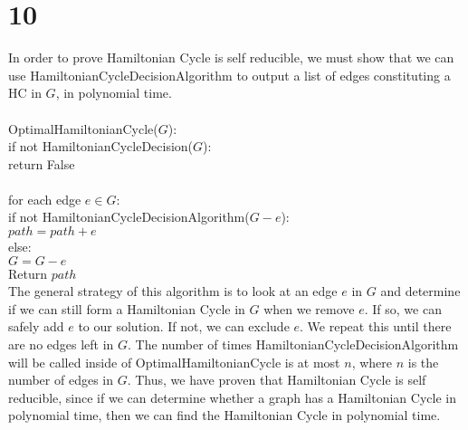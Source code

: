 \documentclass[letterpaper,notitlepage,twoside]{article}
\newcommand\tab[1][1cm]{\hspace*{#1}} %
\begin{document}
\section*{10}
In order to prove Hamiltonian Cycle is self reducible, we must show that we can use HamiltonianCycleDecisionAlgorithm to output a list of edges constituting a HC in $G$, in polynomial time.
\\\\
OptimalHamiltonianCycle($G$):\\
\tab if not HamiltonianCycleDecision($G$):\\
\tab\tab return False
\\\\
\tab for each edge $e \in G$:\\
\tab\tab if not HamiltonianCycleDecisionAlgorithm($G - e$):\\
\tab\tab\tab $path = path + e$\\
\tab\tab else:\\
\tab\tab\tab $G = G - e$\\
\tab Return $path$\\
The general strategy of this algorithm is to look at an edge $e$ in $G$ and determine if we can still form a Hamiltonian Cycle in $G$ when we remove $e$. If so, we can safely add $e$ to our solution. If not, we can exclude $e$. We repeat this until there are no edges left in $G$.
The number of times HamiltonianCycleDecisionAlgorithm will be called inside of OptimalHamiltonianCycle is at most $n$, where $n$ is the number of edges in $G$. Thus, we have proven that Hamiltonian Cycle is self reducible, since if we can determine whether a graph has a Hamiltonian Cycle in polynomial time, then we can find the Hamiltonian Cycle in polynomial time.  
\end{document}

